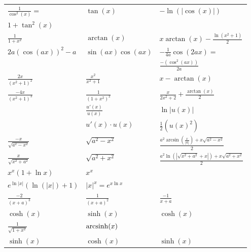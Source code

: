 \begin{tabular}{l | l | l}
    $\frac{1}{\cos^2(x)} =$                                          & $\tan(x)$               & $-\ln(|\cos(x)|)$\\
    $1 + \tan^2(x)$                                                  &                         & \\
    $\frac{1}{1+x^2}$                                                & $\arctan(x)$            & $x \arctan(x) - \frac{\ln(x^2 + 1)}{2}$\\
    $2a(\cos(ax))^2-a$                                               & $\sin(ax) \cos(ax)$     & $-\frac{1}{4a}\cos(2ax) =$\\
                                                                     &                         & $\frac{-(\cos^2(ax))}{2a}$\\
    $\frac{2x}{(x^2 + 1)^2}$                                         & $\frac{x^2}{x^2 + 1}$   & $x - \arctan(x)$\\
    $\frac{-4x}{(x^2 + 1)^3}$                                        & $\frac{1}{(1 + x^2)^2}$ & $\frac{x}{2x^2 + 2} + \frac{\arctan(x)}{2}$\\
                                                                     & $\frac{u'(x)}{u(x)}$    & $\ln |u(x)|$\\
                                                                     & $u'(x) \cdot u(x)$      & $\frac{1}{2}(u(x)^2)$\\
    $\frac{-x}{\sqrt{a^2 - x^2}}$                                    & $\sqrt{a^2 - x^2}$      & $\frac{a^2 \arcsin(\frac{x}{|a|})+ x \sqrt{a^2 - x^2}}{2}$\\
    $\frac{x}{\sqrt{x^2 + a^2}}$                                     & $\sqrt{a^2 + x^2}$      & $\frac{a^2 \ln(| \sqrt{x^2 + a^2} +x|) + x \sqrt{a^2 + x^2}}{2}$\\
    $x^x (1 + \ln x)$                                                & $x^x$                   & \\
    $e^{\ln |x|}(\ln(|x|) + 1)$                                      & $|x|^x = e^{x \ln x}$   & \\
    $\frac{-2}{(x + a)^3}$                                           & $\frac{1}{(x + a)^2}$   & $\frac{-1}{x + a}$\\
    $\cosh(x)$                                                       & $\sinh(x)$              & $\cosh(x)$\\
    $\frac{1}{\sqrt{1+x^2}}$                                         & $\operatorname{arcsinh}(x)$           & \\
    $\sinh(x)$                                                       & $\cosh(x)$              & $\sinh(x)$\\

\end{tabular}
